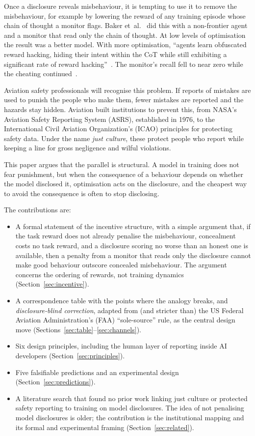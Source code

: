 \documentclass[11pt]{article}
\begin{document}
Once a disclosure reveals misbehaviour, it is tempting to use it to remove the misbehaviour, for example by lowering the reward of any training episode whose chain of thought a monitor flags. Baker et~al.~\cite{baker2025} did this with a non-frontier agent and a monitor that read only the chain of thought. At low levels of optimisation the result was a better model. With more optimisation, ``agents learn obfuscated reward hacking, hiding their intent within the CoT while still exhibiting a significant rate of reward hacking''~\cite[abstract]{baker2025}. The monitor's recall fell to near zero while the cheating continued~\cite[Sec.~3.2]{baker2025}.

Aviation safety professionals will recognise this problem. If reports of mistakes are used to punish the people who make them, fewer mistakes are reported and the hazards stay hidden. Aviation built institutions to prevent this, from NASA's Aviation Safety Reporting System (ASRS), established in 1976, to the International Civil Aviation Organization's (ICAO) principles for protecting safety data. Under the name \emph{just culture}, these protect people who report while keeping a line for gross negligence and wilful violations.

This paper argues that the parallel is structural. A model in training does not fear punishment, but when the consequence of a behaviour depends on whether the model disclosed it, optimisation acts on the disclosure, and the cheapest way to avoid the consequence is often to stop disclosing.

The contributions are:

\begin{itemize}
\item A formal statement of the incentive structure, with a simple argument that, if the task reward does not already penalise the misbehaviour, concealment costs no task reward, and a disclosure scoring no worse than an honest one is available, then a penalty from a monitor that reads only the disclosure cannot make good behaviour outscore concealed misbehaviour. The argument concerns the ordering of rewards, not training dynamics (Section~\ref{sec:incentive}).
\item A correspondence table with the points where the analogy breaks, and \emph{disclosure-blind correction}, adapted from (and stricter than) the US Federal Aviation Administration's (FAA) ``sole-source'' rule, as the central design move (Sections~\ref{sec:table}--\ref{sec:channels}).
\item Six design principles, including the human layer of reporting inside AI developers (Section~\ref{sec:principles}).
\item Five falsifiable predictions and an experimental design (Section~\ref{sec:predictions}).
\item A literature search that found no prior work linking just culture or protected safety reporting to training on model disclosures. The idea of not penalising model disclosures is older; the contribution is the institutional mapping and its formal and experimental framing (Section~\ref{sec:related}).
\end{itemize}
\end{document}
